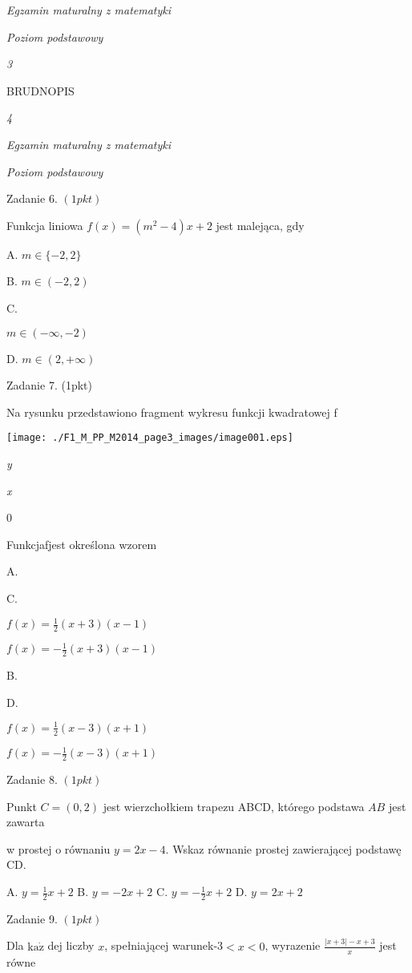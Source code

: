 \documentclass[a4paper,12pt]{article}
\begin{document}
{\it Egzamin maturalny z matematyki}

{\it Poziom podstawowy}

{\it 3}

BRUDNOPIS





{\it 4}

{\it Egzamin maturalny z matematyki}

{\it Poziom podstawowy}

Zadanie 6. $(1pkt)$

Funkcja liniowa $f(x)=(m^{2}-4)x+2$ jest malejąca, gdy

A. $m\in\{-2,2\}$

B. $m\in(-2,2)$

C.

$m\in(-\infty,-2)$

D. $m\in(2,+\infty)$

Zadanie 7. (1pkt)

Na rysunku przedstawiono fragment wykresu funkcji kwadratowej f
\begin{center}
\texttt{[image: ./F1\_M\_PP\_M2014\_page3\_images/image001.eps]}
\end{center}
{\it y}

{\it x}

0

Funkcjafjest określona wzorem

A.

C.

$f(x)=\displaystyle \frac{1}{2}(x+3)(x-1)$

$f(x)=-\displaystyle \frac{1}{2}(x+3)(x-1)$

B.

D.

$f(x)=\displaystyle \frac{1}{2}(x-3)(x+1)$

$f(x)=-\displaystyle \frac{1}{2}(x-3)(x+1)$

Zadanie 8. $(1pkt)$

Punkt $C=(0,2)$ jest wierzchołkiem trapezu ABCD, którego podstawa $AB$ jest zawarta

w prostej o równaniu $y=2x-4$. Wskaz równanie prostej zawierającej podstawę CD.

A. $y=\displaystyle \frac{1}{2}x+2$ B. $y=-2x+2$ C. $y=-\displaystyle \frac{1}{2}x+2$ D. $y=2x+2$

Zadanie 9. $(1pkt)$

Dla $\mathrm{k}\mathrm{a}\dot{\mathrm{z}}$ dej liczby $x$, spełniającej warunek-3$<x<0$, wyrazenie $\displaystyle \frac{|x+3|-x+3}{x}$ jest równe
\end{document}
